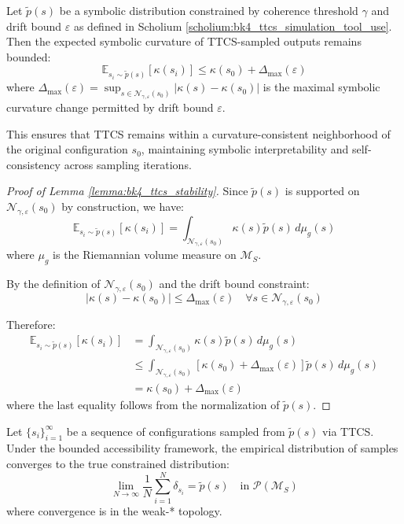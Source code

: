 \begin{lemma}
\label{lemma:bk4_ttcs_stability}
Let $\tilde{p}(s)$ be a symbolic distribution constrained by coherence threshold $\gamma$ and drift bound $\varepsilon$ as defined in Scholium \ref{scholium:bk4_ttcs_simulation_tool_use}. Then the expected symbolic curvature of TTCS-sampled outputs remains bounded:
\[
\mathbb{E}_{s_i \sim \tilde{p}(s)} [\kappa(s_i)] \leq \kappa(s_0) + \Delta_{\max}(\varepsilon)
\]
where $\Delta_{\max}(\varepsilon) = \sup_{s \in \mathcal{N}_{\gamma,\varepsilon}(s_0)} |\kappa(s) - \kappa(s_0)|$ is the maximal symbolic curvature change permitted by drift bound $\varepsilon$.

This ensures that TTCS remains within a curvature-consistent neighborhood of the original configuration $s_0$, maintaining symbolic interpretability and self-consistency across sampling iterations.
\end{lemma}

\begin{proof}[Proof of Lemma \ref{lemma:bk4_ttcs_stability}]
Since $\tilde{p}(s)$ is supported on $\mathcal{N}_{\gamma,\varepsilon}(s_0)$ by construction, we have:
\[
\mathbb{E}_{s_i \sim \tilde{p}(s)} [\kappa(s_i)] = \int_{\mathcal{N}_{\gamma,\varepsilon}(s_0)} \kappa(s) \tilde{p}(s) \, d\mu_g(s)
\]
where $\mu_g$ is the Riemannian volume measure on $\mathcal{M}_S$.

By the definition of $\mathcal{N}_{\gamma,\varepsilon}(s_0)$ and the drift bound constraint:
\[
|\kappa(s) - \kappa(s_0)| \leq \Delta_{\max}(\varepsilon) \quad \forall s \in \mathcal{N}_{\gamma,\varepsilon}(s_0)
\]

Therefore:
\begin{align}
\mathbb{E}_{s_i \sim \tilde{p}(s)} [\kappa(s_i)] &= \int_{\mathcal{N}_{\gamma,\varepsilon}(s_0)} \kappa(s) \tilde{p}(s) \, d\mu_g(s) \\
&\leq \int_{\mathcal{N}_{\gamma,\varepsilon}(s_0)} [\kappa(s_0) + \Delta_{\max}(\varepsilon)] \tilde{p}(s) \, d\mu_g(s) \\
&= \kappa(s_0) + \Delta_{\max}(\varepsilon)
\end{align}
where the last equality follows from the normalization of $\tilde{p}(s)$.
\end{proof}

\begin{theorem}
\label{theorem:bk4_ttcs_convergence}
Let $\{s_i\}_{i=1}^{\infty}$ be a sequence of configurations sampled from $\tilde{p}(s)$ via TTCS. Under the bounded accessibility framework, the empirical distribution of samples converges to the true constrained distribution:
\[
\lim_{N \to \infty} \frac{1}{N} \sum_{i=1}^N \delta_{s_i} = \tilde{p}(s) \quad \text{in } \mathcal{P}(\mathcal{M}_S)
\]
where convergence is in the weak-* topology.
\end{theorem}

